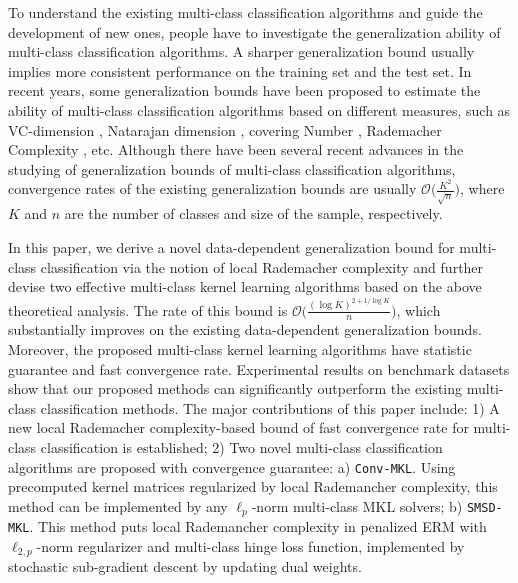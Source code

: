 \documentclass{article}
\begin{document}
To understand the existing multi-class classification algorithms and guide the development of new ones,
people have to investigate the generalization ability of multi-class classification algorithms.
A sharper generalization bound usually implies more consistent
performance on the training set and the test set.
In recent years, some generalization bounds have been proposed to
estimate the ability of multi-class classification algorithms based on different measures,
such as
VC-dimension \cite{allwein2000reducing},
Natarajan dimension \cite{daniely2014optimal},
covering Number \cite{guermeur2002combining,zhang2004statistical,Hill2007},
Rademacher Complexity \cite{koltchinskii2002empirical,mohri2012foundations,cortes2013multi}, etc.
Although there have been several recent advances in the studying of
generalization bounds of multi-class classification algorithms,
convergence rates of the existing generalization bounds are usually %
 $\mathcal{O}\big(\frac{K^2}{\sqrt{n}}\big)$,
where $K$ and $n$ are the number of classes and size of the sample, respectively.



In this paper, we derive a novel data-dependent generalization bound for multi-class classification
via the notion of local Rademacher complexity and
further devise two effective multi-class kernel learning algorithms based on the above theoretical analysis.
The rate of this bound is $\mathcal{O}\big(\frac{(\log K)^{2+{1}/{\log K}}}{n}\big)$,
which substantially improves on  the existing data-dependent generalization bounds.
Moreover, the proposed multi-class kernel learning algorithms have statistic guarantee and fast convergence rate.
Experimental results on benchmark datasets show that our proposed methods can significantly
outperform the existing multi-class classification methods.
The major contributions of this paper include:
 1) A new local Rademacher complexity-based bound of fast convergence rate for multi-class classification is established;
 2) Two novel multi-class classification algorithms are proposed with convergence guarantee: a) \texttt{Conv-MKL}.
Using precomputed kernel matrices regularized by local Rademancher complexity,
this method can be implemented by any $\ell_p$-norm multi-class MKL solvers;
b) \texttt{SMSD-MKL}.
This method puts local Rademancher complexity
in penalized ERM with $\ell_{2,p}$-norm regularizer and multi-class hinge loss function,
implemented by stochastic sub-gradient descent by updating dual weights.


\end{document}
